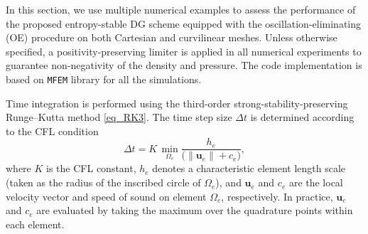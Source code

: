 \documentclass[fleqn,11pt]{amsart}
\begin{document}
In this section, we use multiple numerical examples to assess the performance of the proposed
entropy-stable DG scheme equipped with the oscillation-eliminating (OE)
procedure on both Cartesian and curvilinear meshes. Unless otherwise
specified, a positivity-preserving limiter
\cite{zhang2010positivity,zhang2017positivity} is applied in all
numerical experiments to guarantee non-negativity of the density and
pressure. The code implementation is based on \texttt{MFEM} library \cite{anderson2021mfem, andrej2024high} for all the simulations.

Time integration is performed using the third-order strong-stability-preserving Runge--Kutta method \eqref{eq_RK3}. The time step size
$\Delta t$ is determined according to the CFL condition
\begin{equation}
\label{eq:cfl}
\Delta t
=
K\,
\min_{\Omega_e} \frac{ h_e}{\bigl(\|\bm u_e\|+c_e\bigr)},
\end{equation}
where $K$ is the CFL constant, 
$h_e$ denotes a characteristic element length scale (taken as the
radius of the inscribed circle of $\Omega_e$), and $\bm u_e$ and $c_e$
are the local velocity vector and speed of sound on element $\Omega_e$,
respectively. In practice, $\bm u_e$ and $c_e$ are evaluated by taking
the maximum over the quadrature points within each element.
\end{document}

